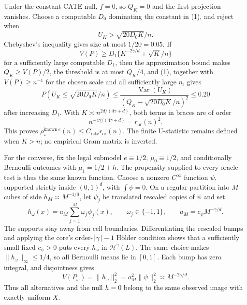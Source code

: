 Under the constant-CATE null, \(f=0\), so \(Q_K=0\) and the first projection vanishes.  Choose a computable \(D_0\) dominating the constant in (1), and reject when
\[
 U_K>\sqrt{20D_0K}/n.
\]
Chebyshev's inequality gives size at most \(1/20=0.05\).  If
\[
 V(P)\ge D_1\{K^{-2\gamma/d}+\sqrt K/n\}
\]
for a sufficiently large computable \(D_1\), then the approximation bound makes \(Q_K\ge V(P)/2\), the threshold is at most \(Q_K/4\), and (1), together with \(V(P)\ge n^{-1}\) for the chosen scale and all sufficiently large \(n\), gives
\[
 P(U_K\le\sqrt{20D_0K}/n)
 \le \frac{\operatorname{Var}(U_K)}{(Q_K-\sqrt{20D_0K}/n)^2}
 \le0.20
\]
after increasing \(D_1\).  With \(K\asymp n^{2d/(4\gamma+d)}\), both terms in braces are of order
\[
 n^{-4\gamma/(4\gamma+d)}=r_{\mathrm{or}}(n)^2.
\]
This proves \(\rho_\star^{\mathrm{known}\ e}(n)\le C_{\mathrm{rate}}r_{\mathrm{or}}(n)\).  The finite U-statistic remains defined when \(K>n\); no empirical Gram matrix is inverted.

For the converse, fix the legal submodel \(e\equiv1/2\), \(\mu_0\equiv1/2\), and conditionally Bernoulli outcomes with \(\mu_1=1/2+h\).  The propensity supplied to every oracle test is thus the same known function.  Choose a nonzero \(C^\infty\) function \(\psi\), supported strictly inside \((0,1)^d\), with \(\int\psi=0\).  On a regular partition into \(M\) cubes of side \(h_M\asymp M^{-1/d}\), let \(\psi_j\) be translated rescaled copies of \(\psi\) and set
\[
 h_\omega(x)=a_M\sum_{j=1}^M\omega_j\psi_j(x),
 \qquad \omega_j\in\{-1,1\},\qquad
 a_M=c_\psi M^{-\gamma/d}.
\]
The supports stay away from cell boundaries.  Differentiating the rescaled bumps and applying the core's order-\(\lceil\gamma\rceil-1\) Hölder condition shows that a sufficiently small fixed \(c_\psi>0\) puts every \(h_\omega\) in \(\mathcal H^\gamma(L)\).  The same choice makes \(\|h_\omega\|_\infty\le1/4\), so all Bernoulli means lie in \([0,1]\).  Each bump has zero integral, and disjointness gives
\[
 V(P_\omega)=\|h_\omega\|_2^2
 =a_M^2\|\psi\|_2^2\asymp M^{-2\gamma/d}. \tag{2}
\]
Thus all alternatives and the null \(h=0\) belong to the same observed image with exactly uniform \(X\).

